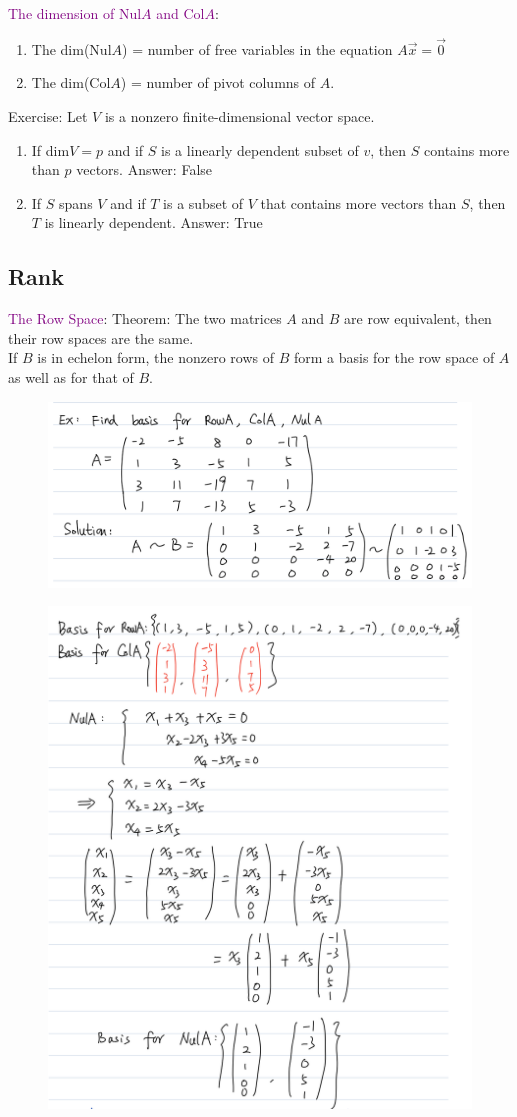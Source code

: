 \documentclass[12pt]{article}
\begin{document}
\textcolor{purple}{The dimension of Nul$A$ and Col$A$}:
\begin{enumerate}
    \item The dim(Nul$A$) = number of free variables in the equation $A\vec{x} = \vec{0}$
    \item The dim(Col$A$) = number of pivot columns of $A$.
\end{enumerate}


Exercise: Let $V$ is a nonzero finite-dimensional vector space.
\begin{enumerate}
    \item If dim$V = p$ and if $S$ is a linearly dependent subset of $v$, then $S$ contains more than $p$ vectors. Answer: False
    \item If $S$ spans $V$ and if $T$ is a subset of $V$ that contains more vectors than $S$, then $T$ is linearly dependent. Answer: True
\end{enumerate}


\subsection{Rank}
\textcolor{purple}{The Row Space}:
Theorem: The two matrices $A$ and $B$ are row equivalent, then their row spaces are the same.\\
If $B$ is in echelon form, the nonzero rows of $B$ form a basis for the row space of $A$ as well as for that of $B$.

\begin{figure}[H]
    \centering
    \includegraphics[width = .5\linewidth]{Revision1}
\end{figure}
\begin{figure}[H]
    \centering
    \includegraphics[width = .5\linewidth]{Revision2}
\end{figure}
\end{document}
